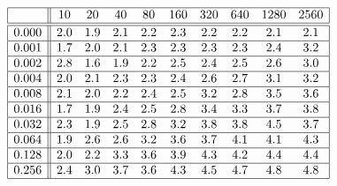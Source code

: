 \[
\begin{array}{|c||ccccccccc|}
\hline 
& 10 & 20 & 40 & 80 & 160 & 320 & 640 & 1280 & 2560\\
\hline \hline 
0.000 & 2.0 & 1.9 & 2.1 & 2.2 & 2.3 & 2.2 & 2.2 & 2.1 & 2.1 \\ \hline 
0.001 & 1.7 & 2.0 & 2.1 & 2.3 & 2.3 & 2.3 & 2.3 & 2.4 & 3.2 \\ \hline 
0.002 & 2.8 & 1.6 & 1.9 & 2.2 & 2.5 & 2.4 & 2.5 & 2.6 & 3.0 \\ \hline 
0.004 & 2.0 & 2.1 & 2.3 & 2.3 & 2.4 & 2.6 & 2.7 & 3.1 & 3.2 \\ \hline 
0.008 & 2.1 & 2.0 & 2.2 & 2.4 & 2.5 & 3.2 & 2.8 & 3.5 & 3.6 \\ \hline 
0.016 & 1.7 & 1.9 & 2.4 & 2.5 & 2.8 & 3.4 & 3.3 & 3.7 & 3.8 \\ \hline 
0.032 & 2.3 & 1.9 & 2.5 & 2.8 & 3.2 & 3.8 & 3.8 & 4.5 & 3.7 \\ \hline 
0.064 & 1.9 & 2.6 & 2.6 & 3.2 & 3.6 & 3.7 & 4.1 & 4.1 & 4.3 \\ \hline 
0.128 & 2.0 & 2.2 & 3.3 & 3.6 & 3.9 & 4.3 & 4.2 & 4.4 & 4.4 \\ \hline 
0.256 & 2.4 & 3.0 & 3.7 & 3.6 & 4.3 & 4.5 & 4.7 & 4.8 & 4.8 \\ \hline 
\end{array}
\]

